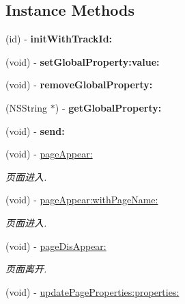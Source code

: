 \subsection*{Instance Methods}
\begin{DoxyCompactItemize}
\item 
\mbox{\label{interface_u_t_tracker_a4caf5e134287a68295efaf01e15d7843}} 
(id) -\/ {\bfseries init\+With\+Track\+Id\+:}
\item 
\mbox{\label{interface_u_t_tracker_a485fde0c2d8e056e415372757f72299b}} 
(void) -\/ {\bfseries set\+Global\+Property\+:value\+:}
\item 
\mbox{\label{interface_u_t_tracker_ac68f2979601212a50e15778a814ac71d}} 
(void) -\/ {\bfseries remove\+Global\+Property\+:}
\item 
\mbox{\label{interface_u_t_tracker_a63cc2e8ee1a61f9c0a62a730fe89c1ec}} 
(N\+S\+String $\ast$) -\/ {\bfseries get\+Global\+Property\+:}
\item 
\mbox{\label{interface_u_t_tracker_a57af3208a56aa74fed83e493353e5278}} 
(void) -\/ {\bfseries send\+:}
\item 
(void) -\/ \mbox{\hyperlink{interface_u_t_tracker_a6381578aef02a4bc703738d142479a61}{page\+Appear\+:}}
\begin{DoxyCompactList}\small\item\em 页面进入. \end{DoxyCompactList}\item 
(void) -\/ \mbox{\hyperlink{interface_u_t_tracker_a7875d1f7b785d1f2299a048e55b2971c}{page\+Appear\+:with\+Page\+Name\+:}}
\begin{DoxyCompactList}\small\item\em 页面进入. \end{DoxyCompactList}\item 
(void) -\/ \mbox{\hyperlink{interface_u_t_tracker_a8d068ed1e1468a5d204f8db9033e1a0e}{page\+Dis\+Appear\+:}}
\begin{DoxyCompactList}\small\item\em 页面离开. \end{DoxyCompactList}\item 
(void) -\/ \mbox{\hyperlink{interface_u_t_tracker_a302c0384d947b7d9b21dac1f66032206}{update\+Page\+Properties\+:properties\+:}}

\end{DoxyCompactItemize}
